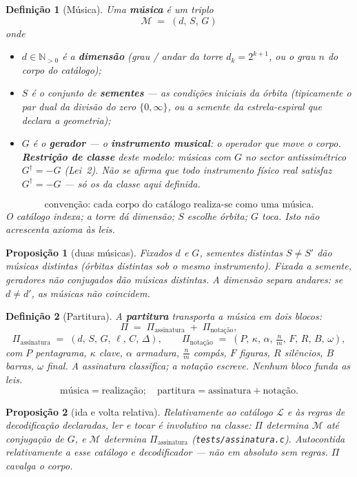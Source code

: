\documentclass[11pt,a4paper]{article}
\newtheorem{definicao}{Definição}
\newtheorem{proposicao}{Proposição}
\newcommand{\code}[1]{\texttt{#1}}
\begin{document}
\begin{definicao}[Música]\label{def:musica}
Uma \textbf{música} é um triplo
\[
\mathcal{M}\;=\;(d,\,S,\,G)
\]
onde
\begin{itemize}
\item $d\in\mathbb{N}_{>0}$ é a \textbf{dimensão} (grau / andar da torre
$d_k=2^{k+1}$, ou o grau $n$ do corpo do catálogo);
\item $S$ é o conjunto de \textbf{sementes} --- as condições iniciais da
órbita (tipicamente o par dual da divisão do zero $\{0,\infty\}$, ou a
semente da estrela-espiral que declara a geometria);
\item $G$ é o \textbf{gerador} --- o \textbf{instrumento musical}: o
operador que move o corpo. \textbf{Restrição de classe} deste modelo:
músicas com $G$ no sector antissimétrico $G^{\dagger}=-G$ (Lei~2).
Não se afirma que todo instrumento físico real satisfaz
$G^{\dagger}=-G$ --- só os da classe aqui definida.
\end{itemize}
\[
\boxed{\text{convenção: cada corpo do catálogo realiza-se como uma música}.}
\]
O catálogo indexa; a torre dá dimensão; $S$ escolhe órbita; $G$ toca.
Isto não acrescenta axioma às leis.
\end{definicao}

\begin{proposicao}[duas músicas]\label{prop:duas-musicas}
Fixados $d$ e $G$, sementes distintas $S\neq S'$ dão músicas distintas
(órbitas distintas sob o mesmo instrumento). Fixada a semente, geradores
não conjugados dão músicas distintas. A dimensão separa andares: se
$d\neq d'$, as músicas não coincidem.
\end{proposicao}

\begin{definicao}[Partitura]\label{def:partitura}
A \textbf{partitura} transporta a música em dois blocos:
\[
\Pi
\;=\;
\Pi_{\mathrm{assinatura}}
\;+\;
\Pi_{\mathrm{notação}},
\]
\[
\Pi_{\mathrm{assinatura}}
\;=\;
(d,\,S,\,G,\,\ell,\,C,\,\Delta),
\qquad
\Pi_{\mathrm{notação}}
\;=\;
(P,\,\kappa,\,\alpha,\,\tfrac{n}{m},\,F,\,R,\,B,\,\omega),
\]
com $P$ pentagrama, $\kappa$ clave, $\alpha$ armadura, $\tfrac{n}{m}$
compás, $F$ figuras, $R$ silêncios, $B$ barras, $\omega$ final.
A assinatura classifica; a notação escreve. Nenhum bloco funda as leis.
\[
\boxed{
\text{música}=\text{realização};\quad
\text{partitura}=\text{assinatura}+\text{notação}.
}
\]
\end{definicao}

\begin{proposicao}[ida e volta relativa]\label{prop:partitura-id}
Relativamente ao catálogo $\mathcal L$ e às regras de decodificação
declaradas, ler e tocar é involutivo na classe: $\Pi$ determina
$\mathcal{M}$ até conjugação de $G$, e $\mathcal{M}$ determina
$\Pi_{\mathrm{assinatura}}$ (\code{tests/assinatura.c}).
Autocontida \emph{relativamente} a esse catálogo e decodificador ---
não em absoluto sem regras. $\Pi$ cavalga o corpo.
\end{proposicao}
\end{document}
